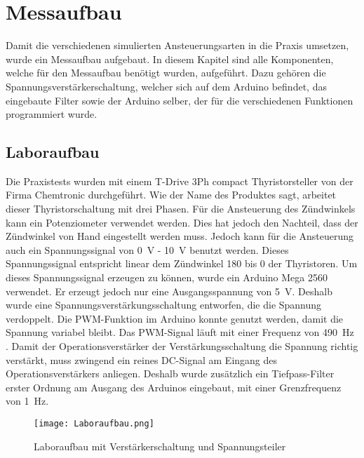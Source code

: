 \section{Messaufbau}
Damit die verschiedenen simulierten Ansteuerungsarten in die Praxis umsetzen, wurde ein Messaufbau aufgebaut. In diesem Kapitel sind alle Komponenten, welche für den Messaufbau benötigt wurden, aufgeführt. Dazu gehören die Spannungsverstärkerschaltung, welcher sich auf dem Arduino befindet, das eingebaute Filter sowie der Arduino selber, der für die verschiedenen Funktionen programmiert wurde.
\subsection{Laboraufbau}
Die Praxistests wurden mit einem \grqq T-Drive 3Ph compact Thyristorsteller\grqq \hspace{0.02cm} von der Firma Chemtronic durchgeführt. Wie der Name des Produktes sagt, arbeitet dieser Thyristorschaltung mit drei Phasen. Für die Ansteuerung des Zündwinkels kann ein Potenziometer verwendet werden. Dies hat jedoch den Nachteil, dass der Zündwinkel von Hand eingestellt werden muss. Jedoch kann für die Ansteuerung auch ein Spannungssignal von \SI{0}{V} - \SI{10}{V} benutzt werden. Dieses Spannungssignal entspricht linear dem Zündwinkel 180\textdegree \hspace{0.02cm} bis 0\textdegree \hspace{0.02cm} der Thyristoren. Um dieses Spannungssignal erzeugen zu können, wurde ein Arduino Mega 2560 verwendet. Er erzeugt jedoch nur eine Ausgangsspannung von \SI{5}{V}. Deshalb wurde eine Spannungsverstärkungsschaltung entworfen, die die Spannung verdoppelt. Die PWM-Funktion im Arduino konnte genutzt werden, damit die Spannung variabel bleibt. Das PWM-Signal läuft mit einer Frequenz von \SI{490}{Hz} \cite{Arduino_PWM}. 
Damit der Operationsverstärker der Verstärkungsschaltung die Spannung richtig verstärkt, muss zwingend ein reines DC-Signal am Eingang des Operationsverstärkers anliegen. Deshalb wurde zusätzlich ein Tiefpass-Filter erster Ordnung am Ausgang des Arduinos eingebaut, mit einer Grenzfrequenz von \SI{1}{Hz}.  



\begin{figure}[ht!]  
	\centering
	\texttt{[image: Laboraufbau.png]}	
	\caption{Laboraufbau mit Verstärkerschaltung und Spannungsteiler}\label{fig:Laboraufbau}
\end{figure}

